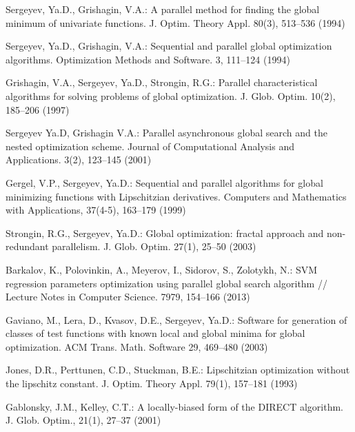 \documentclass[smallcondensed]{svjour3}     %
\begin{document}
\begin{thebibliography}{}
Sergeyev, Ya.D., Grishagin, V.A.: A parallel method for finding the global minimum of univariate functions. J. Optim. Theory Appl. 80(3), 513--536 (1994)

Sergeyev, Ya.D., Grishagin, V.A.:  Sequential and parallel global optimization algorithms. Optimization Methods and Software. 3, 111--124 (1994)

Grishagin, V.A., Sergeyev, Ya.D., Strongin, R.G.: Parallel characteristical algorithms for solving problems of global optimization. J. Glob. Optim. 10(2), 185--206 (1997)

Sergeyev Ya.D, Grishagin V.A.: Parallel asynchronous global search and the nested optimization scheme. Journal of Computational Analysis and Applications. 3(2), 123--145 (2001)

Gergel, V.P., Sergeyev, Ya.D.: Sequential and parallel algorithms for global minimizing functions with Lipschitzian derivatives. Computers and Mathematics with Applications, 37(4-5), 163--179 (1999)

Strongin, R.G., Sergeyev, Ya.D.: Global optimization: fractal approach and non-redundant parallelism. J. Glob. Optim. 27(1), 25--50 (2003)

Barkalov, K., Polovinkin, A., Meyerov, I., Sidorov, S., Zolotykh, N.: SVM regression parameters optimization using parallel global search algorithm // Lecture Notes in Computer Science. 7979, 154--166 (2013)

Gaviano, M., Lera, D., Kvasov, D.E., Sergeyev, Ya.D.: Software for generation of classes of test functions with known local and global minima for global optimization. ACM Trans. Math. Software 29, 469--480 (2003)

Jones, D.R., Perttunen, C.D., Stuckman, B.E.: Lipschitzian optimization without the lipschitz constant. J. Optim. Theory Appl. 79(1), 157--181 (1993)

Gablonsky, J.M., Kelley, C.T.: A locally-biased form of the DIRECT algorithm. J. Glob. Optim., 21(1), 27--37 (2001)


\end{thebibliography}
\end{document}
